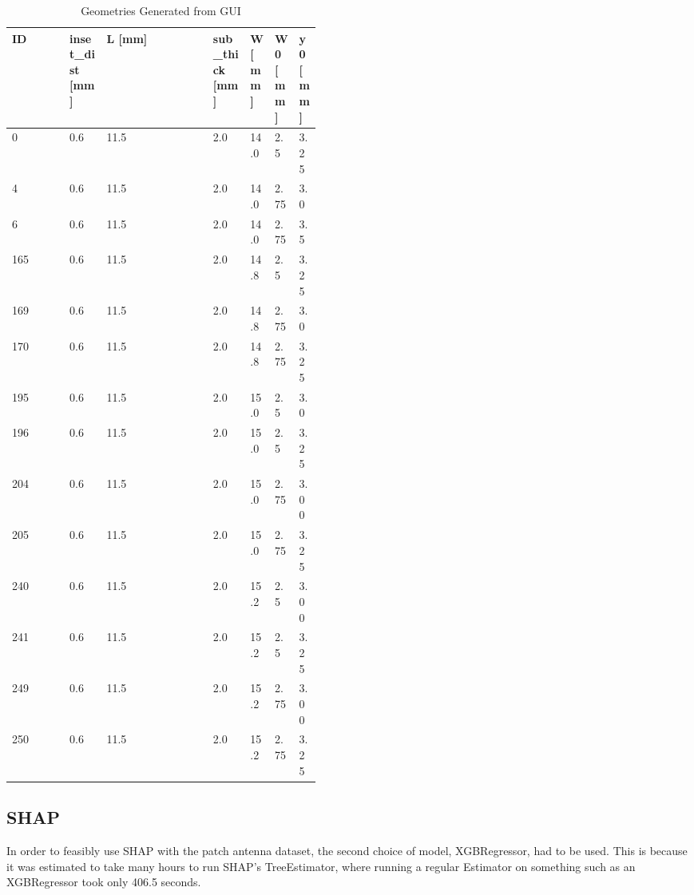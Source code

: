 \documentclass[conference]{IEEEtran}
\begin{document}
\begin{table}[h]
\caption{Geometries Generated from GUI}
\begin{center}
\begin{tabular}{ |l|p{0.12\linewidth}|l|p{0.12\linewidth}|p{0.07\linewidth}|p{0.07\linewidth}|p{0.07\linewidth}| }
    \hline
    ID & inset\_dist [mm] & L [mm] & sub\_thick [mm] & W [mm] & W0 [mm] & y0 [mm] \\ 
    \hline
    0 & 0.6 & 11.5 & 2.0 & 14.0 & 2.5 & 3.25 \\
    \hline
    4 & 0.6 & 11.5 & 2.0 & 14.0 & 2.75 & 3.0 \\
    \hline
    6 & 0.6 & 11.5 & 2.0 & 14.0 & 2.75 & 3.5 \\
    \hline
    165 & 0.6 & 11.5 & 2.0 & 14.8 & 2.5 & 3.25 \\
    \hline
    169 & 0.6 & 11.5 & 2.0 & 14.8 & 2.75 & 3.0 \\
    \hline
    170 & 0.6 & 11.5 & 2.0 & 14.8 & 2.75 & 3.25 \\
    \hline
    195 & 0.6 & 11.5 & 2.0 & 15.0 & 2.5 & 3.0 \\
    \hline
    196 & 0.6 & 11.5 & 2.0 & 15.0 & 2.5 & 3.25 \\
    \hline
    204 & 0.6 & 11.5 & 2.0 & 15.0 & 2.75 & 3.00 \\
    \hline
    205 & 0.6 & 11.5 & 2.0 & 15.0 & 2.75 & 3.25 \\
    \hline
    240 & 0.6 & 11.5 & 2.0 & 15.2 & 2.5 & 3.00 \\
    \hline
    241 & 0.6 & 11.5 & 2.0 & 15.2 & 2.5 & 3.25 \\
    \hline
    249 & 0.6 & 11.5 & 2.0 & 15.2 & 2.75 & 3.00 \\
    \hline
    250 & 0.6 & 11.5 & 2.0 & 15.2 & 2.75 & 3.25 \\
    \hline
\end{tabular}
\end{center}
\label{gui_geometries}
\end{table}    

\subsection{SHAP}
In order to feasibly use SHAP with the patch antenna dataset, the second choice of model, XGBRegressor, had to be used. This is because it was estimated to take many hours to run SHAP's TreeEstimator, where running a regular Estimator on something such as an XGBRegressor took only 406.5 seconds.
\end{document}
